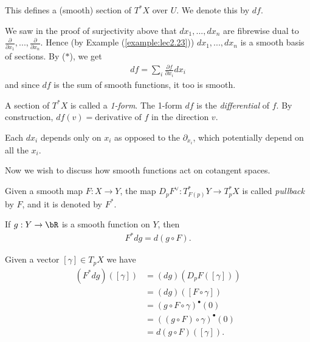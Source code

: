 \begin{lem}\label{lem:lec2.26}
	This defines a (smooth) section of $T^*X$ over $U$. We denote this by $df$.
\end{lem}
\begin{prf}
	We saw in the proof of surjectivity above that $dx_1,...,dx_n$ are fibrewise dual to $\frac{\partial}{\partial x_1}, ...,\frac{\partial}{\partial x_n}$. Hence (by Example (\ref{example:lec2.23})) $dx_1,...,dx_n$ is a smooth basis of sections. By ($\ast$), we get
	\begin{align*}
		df = \sum_i \frac{\partial f}{\partial x_i}dx_i
	\end{align*}
	and since $df$ is the sum of smooth functions, it too is smooth.
\end{prf}

\begin{lem}\label{lem:lec2.27}
	A section of $T^*X$ is called a \emph{1-form}. The 1-form $df$ is the \emph{differential} of $f$. By construction, $df(v) = \text{derivative of $f$ in the direction $v$}$.
\end{lem}

\begin{rmk}\label{rmk:lec2.28}
	Each $dx_i$ depends only on $x_i$ as opposed to the $\partial_{x_i}$, which potentially depend on all the $x_i$.
\end{rmk}

Now we wish to discuss how smooth functions act on cotangent spaces.

\begin{defn}\label{defn:pullback}
	Given a smooth map $F:X\to Y$, the map $D_pF^\vee:T_{F(p)}^* Y \to T_{p}^*X$ is called \emph{pullback} by $F$, and it is denoted by $F^*$.
\end{defn}
\begin{lem}\label{lem:lec2.30}
	If $g:Y\to \bR$ is a smooth function on $Y$, then
	\begin{align*}
		F^* dg = d(g\circ F).
	\end{align*}
\end{lem}
\begin{prf}
	Given a vector $[\gamma] \in T_pX$ we have
	\begin{align*}
		(F^*dg)([\gamma]) &= (dg)(D_pF([\gamma])) \\
						  &= (dg)([F\circ \gamma]) \\
						  &= (g\circ F\circ \gamma)^\bullet(0) \\
						  &= ((g\circ F)\circ \gamma)^\bullet (0) \\
						  &= d(g\circ F)([\gamma]).
	\end{align*}
\end{prf}

